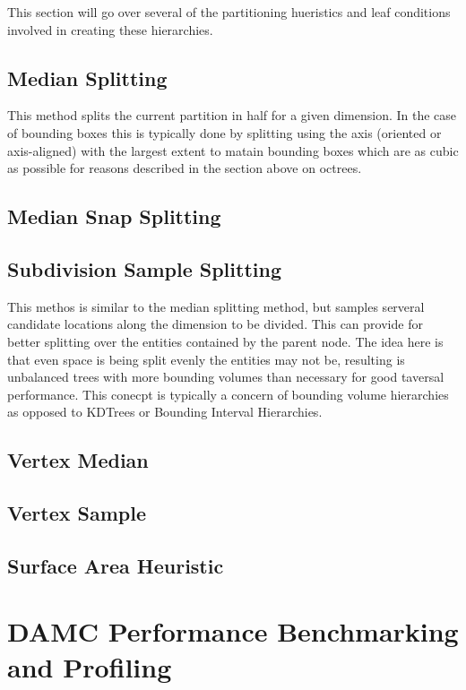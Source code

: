 \documentclass[10pt, a4paper]{article}
\begin{document}
This section will go over several of the partitioning hueristics and leaf conditions involved in creating these hierarchies.

\subsection{Median Splitting}

This method splits the current partition in half for a given dimension. In the case of bounding boxes this is typically done by splitting using the axis (oriented or axis-aligned) with the largest extent to matain bounding boxes which are as cubic as possible for reasons described in the section above on octrees.

\subsection{Median Snap Splitting}

\subsection{Subdivision Sample Splitting}

This methos is similar to the median splitting method, but samples serveral candidate locations along the dimension to be divided. This can provide for better splitting over the entities contained by the parent node. The idea here is that even space is being split evenly the entities may not be, resulting is unbalanced trees with more bounding volumes than necessary for good taversal performance. This conecpt is typically a concern of bounding volume hierarchies as opposed to KDTrees or Bounding Interval Hierarchies. 


\subsection{Vertex Median}

\subsection{Vertex Sample}

\subsection{Surface Area Heuristic}

\section{DAMC Performance Benchmarking and Profiling}
\end{document}
